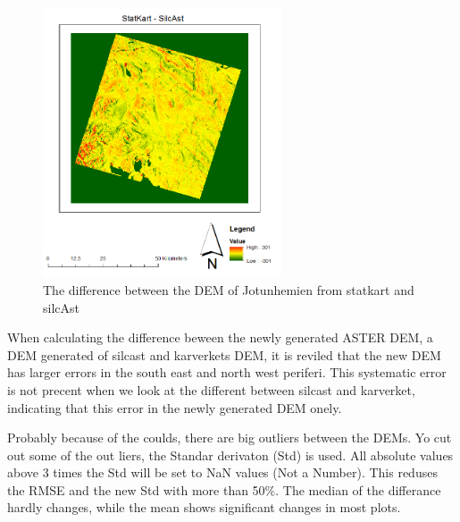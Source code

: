 \documentclass[a4paper,UKenglish]{article}
\begin{document}
\begin{figure}
	\includegraphics[height=8cm]{DiffJotun-Stat-Sil}
	\caption{The difference between the DEM of Jotunhemien from statkart and silcAst}
\end{figure}

When calculating the difference beween the newly generated ASTER DEM, a DEM generated of silcast and karverkets DEM, it is reviled that the new DEM has larger errors in the south east and north west periferi. This systematic error is not precent when we look at the different between silcast and karverket, indicating that this error in the newly generated DEM onely.

Probably because of the coulds, there are big outliers between the DEMs. Yo cut out some of the out liers, the Standar derivaton (Std) is used. All absolute values above 3 times the Std will be set to NaN values (Not a Number). This reduses the RMSE and the new Std with more than 50$\%$. The median of the differance hardly changes, while the mean shows significant changes in most  plots. 
\end{document}
